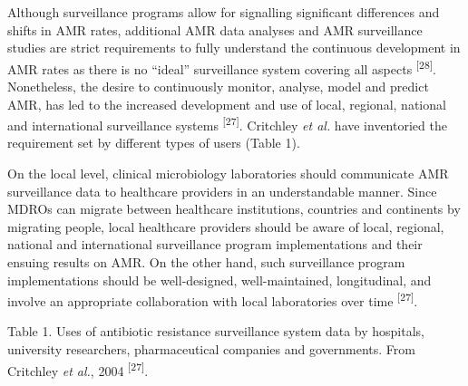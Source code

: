 \documentclass[
]{book}
\begin{document}
Although surveillance programs allow for signalling significant differences and shifts in AMR rates, additional AMR data analyses and AMR surveillance studies are strict requirements to fully understand the continuous development in AMR rates as there is no ``ideal'' surveillance system covering all aspects \textsuperscript{{[}28{]}}. Nonetheless, the desire to continuously monitor, analyse, model and predict AMR, has led to the increased development and use of local, regional, national and international surveillance systems \textsuperscript{{[}27{]}}. Critchley \emph{et al.} have inventoried the requirement set by different types of users (Table 1).

On the local level, clinical microbiology laboratories should communicate AMR surveillance data to healthcare providers in an understandable manner. Since MDROs can migrate between healthcare institutions, countries and continents by migrating people, local healthcare providers should be aware of local, regional, national and international surveillance program implementations and their ensuing results on AMR. On the other hand, such surveillance program implementations should be well-designed, well-maintained, longitudinal, and involve an appropriate collaboration with local laboratories over time \textsuperscript{{[}27{]}}.

Table 1. Uses of antibiotic resistance surveillance system data by hospitals, university researchers, pharmaceutical companies and governments. From Critchley \emph{et al.}, 2004 \textsuperscript{{[}27{]}}.
\end{document}
